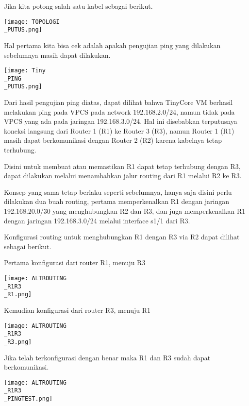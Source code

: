 \documentclass[12pt, a4paper]{article}
\begin{document}
  Jika kita potong salah satu kabel sebagai berikut.

  \begin{center}
    \texttt{[image: TOPOLOGI\\\_PUTUS.png]}
  \end{center}

  Hal pertama kita bisa cek adalah apakah pengujian ping yang dilakukan sebelumnya
  masih dapat dilakukan.

  \begin{center}
    \texttt{[image: Tiny\\\_PING\\\_PUTUS.png]}
  \end{center}

  Dari hasil pengujian ping diatas, dapat dilihat bahwa TinyCore VM berhasil melakukan
  ping pada VPCS pada network 192.168.2.0/24, namun tidak pada VPCS yang
  ada pada jaringan 192.168.3.0/24. Hal ini disebabkan terputusnya koneksi langsung
  dari Router 1 (R1) ke Router 3 (R3), namun Router 1 (R1) masih dapat berkomunikasi
  dengan Router 2 (R2) karena kabelnya tetap terhubung.

  Disini untuk membuat atau memastikan R1 dapat tetap terhubung dengan R3, 
  dapat dilakukan melalui menambahkan jalur routing dari R1 melalui R2 ke R3.

  Konsep yang sama tetap berlaku seperti sebelumnya, hanya saja disini perlu 
  dilakukan dua buah routing, pertama memperkenalkan R1 dengan jaringan 
  192.168.20.0/30 yang menghubungkan R2 dan R3, dan juga memperkenalkan R1
  dengan jaringan 192.168.3.0/24 melalui interface s1/1 dari R3.

  Konfigurasi routing untuk menghubungkan R1 dengan R3 via R2 dapat dilihat
  sebagai berikut.

  Pertama konfigurasi dari router R1, menuju R3
  \begin{center}
    \texttt{[image: ALTROUTING\\\_R1R3\\\_R1.png]}
  \end{center}

  Kemudian konfigurasi dari router R3, menuju R1
  \begin{center}
    \texttt{[image: ALTROUTING\\\_R1R3\\\_R3.png]}
  \end{center}

  Jika telah terkonfigurasi dengan benar maka R1 dan R3 sudah dapat
  berkomunikasi.

  \begin{center}
    \texttt{[image: ALTROUTING\\\_R1R3\\\_PINGTEST.png]}
  \end{center}
\end{document}
